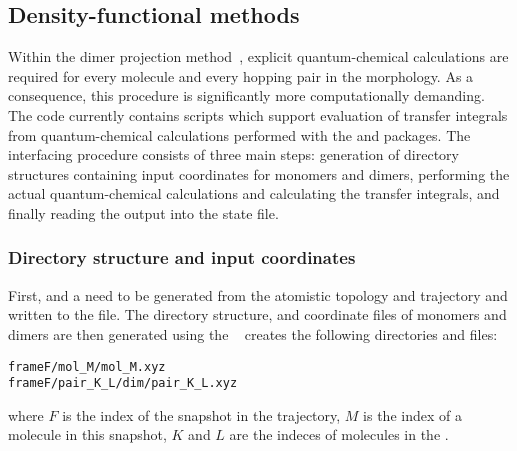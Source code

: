 \subsection{Density-functional methods}
\label{sec:dft}

Within the dimer projection method~\cite{valeev_effect_2006,baumeier_density-functional_2010}, explicit quantum-chemical calculations are required for every molecule and every hopping pair in the morphology. As a consequence, this procedure is significantly more computationally demanding. The code currently contains scripts which support evaluation of transfer integrals from quantum-chemical calculations performed with the \gaussian and \turbomole packages. The interfacing procedure consists of three main steps: generation of directory structures containing input coordinates for monomers and dimers, performing the actual quantum-chemical calculations and calculating the transfer integrals, and finally reading the output into the state file.

\subsubsection{Directory structure and input coordinates}
First,  and a  need to be generated from the atomistic topology and trajectory and written to the \sqlstate file. The directory structure, and coordinate files of monomers and dimers are then generated using the  \calculator
\vskip 0.1cm
{\noindent \small \ctprun \opt \xmloptions \seg \xmlsegments \ \sqlstate \exe {} }
\vskip 0.1cm
 creates the following directories and files:
\begin{verbatim}
frameF/mol_M/mol_M.xyz
frameF/pair_K_L/dim/pair_K_L.xyz
\end{verbatim}
where $F$ is the index of the snapshot in the trajectory, $M$ is the index of a molecule in this snapshot, $K$ and $L$ are the indeces of molecules in the .  

